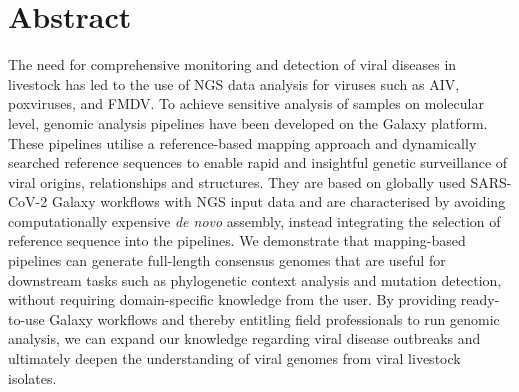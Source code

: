 \chapter*{Abstract}
The need for comprehensive monitoring and detection of viral diseases in livestock has led to the use of \ac{NGS} data analysis for viruses such as \ac{AIV}, poxviruses, and \ac{FMDV}. To achieve sensitive analysis of samples on molecular level, genomic analysis pipelines have been developed on the Galaxy platform. These pipelines utilise a reference-based mapping approach and dynamically searched reference sequences to enable rapid and insightful genetic surveillance of viral origins, relationships and structures. They are based on globally used SARS-CoV-2 Galaxy workflows with \ac{NGS} input data and are characterised by avoiding computationally expensive \textit{de novo} assembly, instead integrating the selection of reference sequence into the pipelines. We demonstrate that mapping-based pipelines can generate full-length consensus genomes that are useful for downstream tasks such as phylogenetic context analysis and mutation detection, without requiring domain-specific knowledge from the user. By providing ready-to-use Galaxy workflows and thereby entitling field professionals to run genomic analysis, we can expand our knowledge regarding viral disease outbreaks and ultimately deepen the understanding of viral genomes from viral livestock isolates.
